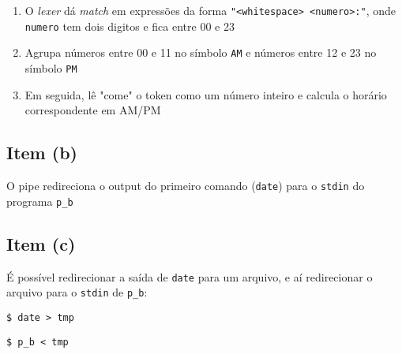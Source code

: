 \documentclass{article}
\begin{document}
\begin{enumerate}
    \item O \textit{lexer} dá \textit{match} em expressões da forma \texttt{"<whitespace> <numero>:"}, onde \texttt{numero} tem dois digitos e fica entre 00 e 23

    \item Agrupa números entre 00 e 11 no símbolo \texttt{AM} e números entre 12 e 23 no símbolo \texttt{PM}
    \item Em seguida, lê "come" o token como um número inteiro e calcula o horário correspondente em AM/PM
\end{enumerate}

\subsection*{Item (b)}

O pipe redireciona o output do primeiro comando (\texttt{date}) para o \texttt{stdin} do programa \texttt{p\_b}

\subsection*{Item (c)}

É possível redirecionar a saída de \texttt{date} para um arquivo, e aí redirecionar o arquivo para o \texttt{stdin} de \texttt{p\_b}:

\begin{center}
    \texttt{\$ date > tmp}

    \texttt{\$ p\_b < tmp}
\end{center}
\end{document}
